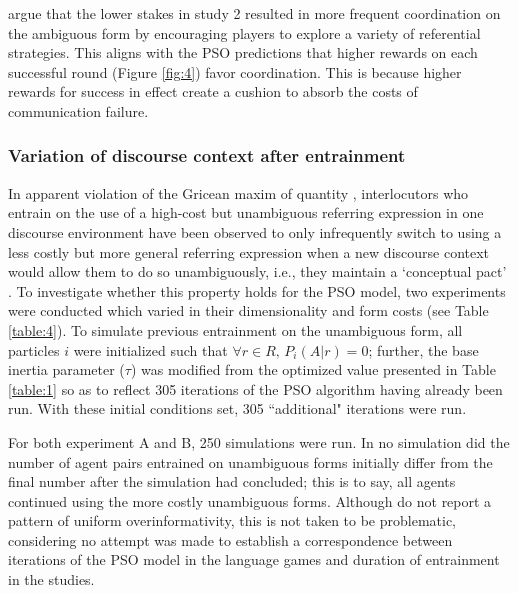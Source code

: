 \documentclass[a4paper,11pt]{article}
\begin{document}
\citeauthor{rohde2012} argue that the lower stakes in study 2 resulted in more frequent coordination on the ambiguous form by encouraging players to explore a variety of referential strategies. This aligns with the PSO predictions that higher rewards on each successful round (Figure \ref{fig:4}) favor coordination.  This is because higher rewards for success in effect create a cushion to absorb the costs of communication failure.

\subsubsection{Variation of discourse context after entrainment}
In apparent violation of the Gricean maxim of quantity \cite{grice1975}, interlocutors who entrain on the use of a high-cost but unambiguous referring expression in one discourse environment have been observed to only infrequently switch to using a less costly but more general referring expression when a new discourse context would allow them to do so unambiguously, i.e., they maintain a `conceptual pact' \cite{brennan1996}. To investigate whether this property holds for the PSO model, two experiments were conducted which varied in their dimensionality and form costs (see Table \ref{table:4}). To simulate previous entrainment on the unambiguous form, all particles $i$ were initialized such that $\forall r \in R,\, P_i(A|r) = 0$; further, the base inertia parameter ($\tau$) was modified from the optimized value presented in Table \ref{table:1} so as to reflect 305 iterations of the PSO algorithm having already been run. With these initial conditions set, 305 ``additional" iterations were run.

For both experiment A and B, 250 simulations were run. In no simulation did the number of agent pairs entrained on unambiguous forms initially differ from the final number after the simulation had concluded; this is to say, all agents continued using the more costly unambiguous forms. Although \citeauthor{brennan1996} do not report a pattern of uniform overinformativity, this is not taken to be problematic, considering no attempt was made to establish a correspondence between iterations of the PSO model in the \citeauthor{rohde2012} language games and duration of entrainment in the \citeauthor{brennan1996} studies. 
\end{document}
